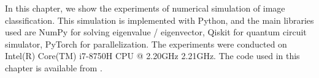 \par In this chapter, we show the experiments of numerical simulation of image classification. This simulation is implemented with Python, and the main libraries used are NumPy \cite{harris2020array} for solving eigenvalue / eigenvector, Qiskit \cite{Qiskit} for quantum circuit simulator, PyTorch \cite{NEURIPS2019_9015} for parallelization. The experiments were conducted on Intel(R) Core(TM) i7-8750H CPU @ 2.20GHz 2.21GHz. The code used in this chapter is available from \cite{mycode}.